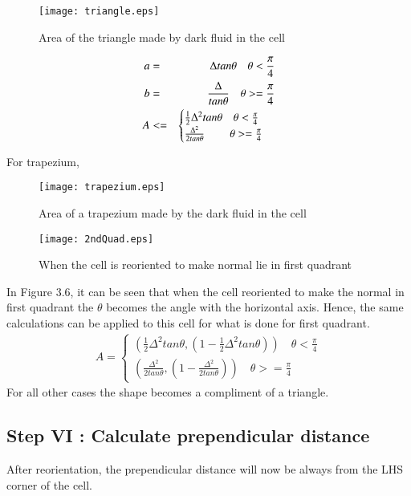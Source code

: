 \begin{figure}[H] 
\centering
\texttt{[image: triangle.eps]}
\caption{Area of the triangle made by dark fluid in the cell}
\end{figure}

\begin{eqnarray}
 a&=&\Delta tan\theta \text{\quad $\theta < \frac{\pi}{4}$} \\  
 b&=&\frac{\Delta}{tan\theta} \text{\quad $\theta >= \frac{\pi}{4}$}\\
 A&<=&\begin{cases}\frac{1}{2}\Delta^2 tan\theta \text{\quad $\theta < \frac{\pi}{4}$}\\
     \frac{\Delta^2}{2tan\theta}   \text{\qquad \space $\theta>=\frac{\pi}{4}$}
    \end{cases}
\end{eqnarray}

For trapezium,
\begin{figure}[H]
\centering
\texttt{[image: trapezium.eps]}
\caption{Area of a trapezium made by the dark fluid in the cell}
\end{figure}
\begin{figure}[H]
 \centering
 \texttt{[image: 2ndQuad.eps]}
 \caption{When the cell is reoriented to make normal lie in first quadrant}
\end{figure}
In Figure 3.6, it can be seen that when the cell reoriented to make the normal in first quadrant the $\theta$ becomes the angle with the horizontal axis.
Hence, the same calculations can be applied to this cell for what is done for first quadrant. 
\begin{equation}
\begin{split}
 A=\begin{cases}(\frac{1}{2}\Delta^2 tan\theta,(1-\frac{1}{2}\Delta^2 tan\theta)) \quad  \theta < \frac{\pi}{4}\\
     (\frac{\Delta^2}{2tan\theta},(1-\frac{\Delta^2}{2tan\theta}))  \quad  \theta>=\frac{\pi}{4}
    \end{cases}
      \end{split}
\end{equation}
For all other cases the shape becomes a compliment of a triangle.

\subsection{Step VI : Calculate prependicular distance }
After reorientation, the prependicular distance will now be always from the LHS corner of the cell.

